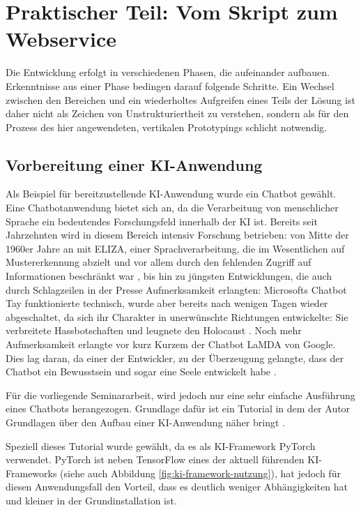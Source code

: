 \documentclass[12pt,oneside,titlepage,listof=totoc,bibliography=totoc]{scrartcl}
\begin{document}
\newpage
\section{Praktischer Teil: Vom Skript zum Webservice}

Die Entwicklung erfolgt in verschiedenen Phasen, die aufeinander aufbauen. Erkenntnisse aus einer Phase bedingen darauf folgende Schritte. Ein Wechsel zwischen den Bereichen und ein wiederholtes Aufgreifen eines Teils der Lösung ist daher nicht als Zeichen von Unstrukturiertheit zu verstehen, sondern als für den Prozess des hier angewendeten, vertikalen Prototypings schlicht notwendig. 


\subsection{Vorbereitung einer KI-Anwendung}



Als Beispiel für bereitzustellende KI-Anwendung wurde ein Chatbot gewählt. Eine Chatbotanwendung bietet sich an, da die Verarbeitung von menschlicher Sprache ein bedeutendes Forschungsfeld innerhalb der \ac{KI} ist. Bereits seit Jahrzehnten wird in diesem Bereich intensiv Forschung betrieben: von Mitte der 1960er Jahre an mit \zb ELIZA, einer Sprachverarbeitung, die im Wesentlichen auf Mustererkennung abzielt und vor allem durch den fehlenden Zugriff auf Informationen beschränkt war \parencite{20-weizenbaum1983eliza}, bis hin zu jüngsten Entwicklungen, die auch durch Schlagzeilen in der Presse Aufmerksamkeit erlangten: Microsofts Chatbot Tay funktionierte technisch, wurde aber bereits nach wenigen Tagen wieder abgeschaltet, da sich ihr Charakter in unerwünschte Richtungen entwickelte: Sie verbreitete Hassbotschaften und leugnete den Holocaust \parencite{14-heise-tay-abschaltung}. Noch mehr Aufmerksamkeit erlangte vor kurz Kurzem der Chatbot LaMDA von Google. Dies lag daran, da einer der Entwickler, zu der Überzeugung gelangte, dass der Chatbot ein Bewusstsein und sogar eine Seele entwickelt habe \parencite[]{10-heise-google-chatbot}.

Für die vorliegende Seminararbeit, wird jedoch nur eine sehr einfache Ausführung eines Chatbots herangezogen. Grundlage dafür ist ein Tutorial in dem der Autor \citeauthor[]{50-howto-cahtbot} Grundlagen über den  Aufbau einer KI-Anwendung näher bringt \parencite{50-howto-cahtbot}. 

Speziell dieses Tutorial wurde gewählt, da es als KI-Framework PyTorch verwendet. PyTorch ist neben TensorFlow eines der aktuell führenden KI-Frameworks (siehe auch Abbildung \ref{fig:ki-framework-nutzung}), hat jedoch für diesen Anwendungsfall den Vorteil, dass es deutlich weniger Abhängigkeiten hat und kleiner in der Grundinstallation ist. 
\end{document}
